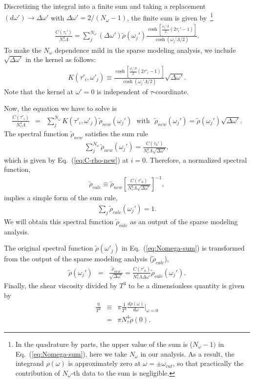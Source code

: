\documentclass[a4paper,11pt]{article}
\newcommand\beq{ \begin{eqnarray} }
\newcommand\eeq{ \end{eqnarray} }
\begin{document}
Discretizing the integral into a finite sum and taking a replacement $ (d\omega ' ) \rightarrow \Delta \omega'$ with $\Delta \omega ' = 2/(N_{\omega}-1)$,
the finite sum is given by~\footnote{In the quadrature by parts, the upper value of the sum is ($N_\omega-1)$ in Eq.~(\ref{eq:Nomega-sum}), here we take $N_\omega$ in our analysis. 
As a result, the integrand $\rho(\omega)$ is approximately zero at $\omega = \pm \omega_{cut}$, so that practically the contribution of $N_\omega$-th data to the sum is negligible.}
\beq
\frac{C(\tau_i')}{N_\tau ^4 \Lambda} = \sum_{j}^{N_\omega} (\Delta \omega ' ) \tilde{\rho}(\omega_j')  \frac{\cosh [\frac{\omega_j ' \Lambda }{2} (2 \tau_i' -1)]}{\cosh (\omega_j ' \Lambda /2)}.\label{eq:Nomega-sum}
\eeq
To make the $N_\omega$ dependence mild in the sparse modeling analysis, we include $\sqrt{\Delta \omega'}$ in the kernel as follows:
\beq
K(\tau'_i,\omega'_j)  \equiv \frac{\cosh [\frac{\omega_j ' \Lambda }{2} (2 \tau'_i -1)]}{\cosh (\omega_j ' \Lambda /2)} \sqrt{\Delta \omega'}.
\eeq
Note that the kernel at $\omega'=0$ is independent of $\tau$-coordinate.

Now, the equation we have to solve is
\beq
\frac{C(\tau'_i)}{N_\tau^4 \Lambda} &=& \sum_j^{N_\omega} K(\tau'_i,\omega'_j) \tilde{\rho}_{new} (\omega_j ')~~~ \mbox{with}~~~
\tilde{\rho}_{new} (\omega_j ') = \tilde{\rho} (\omega_j ') \sqrt{\Delta \omega'}. \label{eq:C-rho-new}
\eeq
The spectral function $\tilde{\rho}_{new}$ satisfies the sum rule
\beq
\sum_j^{N_\omega} \tilde{\rho}_{new} (\omega_j ') =\frac{C(\tau_0')}{N_\tau^4 \Lambda \sqrt{\Delta \omega '}},
\eeq
which is given by Eq.~(\ref{eq:C-rho-new}) at $i=0$.
Therefore, a normalized spectral function,
\beq
\tilde{\rho}_{calc}  \equiv \tilde{\rho}_{new}  \left[ \frac{C(\tau'_0)}{N_\tau^4 \Lambda \sqrt{\Delta \omega '}} \right]^{-1},
\eeq
implies a simple form of the sum rule,
\beq
\sum_j \tilde{\rho}_{calc} (\omega_j ') = 1.\label{eq:sum-rule-Sp}
\eeq
We will obtain this spectral function $\tilde{\rho}_{calc}$ as an output of the sparse modeling analysis.

The original spectral function $\tilde{\rho}(\omega'_j)$ in Eq.~(\ref{eq:Nomega-sum}) is transformed from the output of the sparse modeling analysis ($\tilde{\rho}_{calc}$),
\beq
\tilde{\rho} (\omega_j ') &= &\frac{\tilde{\rho}_{new}}{\sqrt{\Delta \omega '}} 
= \frac{C(\tau'_0)}{N_\tau^4 \Lambda \Delta \omega '} \tilde{\rho}_{calc} (\omega_j ').\label{eq:tilde-rho-calc}
\eeq
Finally, the shear viscosity divided by $T^3$ to be a dimensionless quantity is given by 
\beq
\frac{\eta}{T^3} &\equiv & \pi \frac{1}{T^3} \frac{d \rho (\omega)}{d \omega} |_{\omega =0} \nonumber\\
&=& \pi {N_\tau^4} \tilde{\rho} (0). \label{eq:eta-rho-calc}
\eeq
\end{document}
